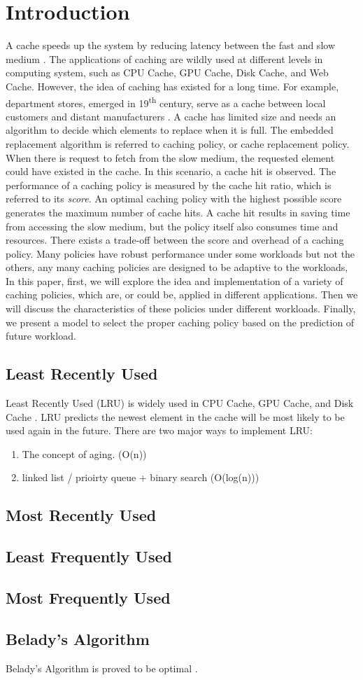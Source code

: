 \section{Introduction}
A cache speeds up the system by reducing latency between the fast and slow medium \cite{cache}.
The applications of caching are wildly used at different levels in computing system, such as
  CPU Cache, GPU Cache, Disk Cache, and Web Cache.
However, the idea of caching has existed for a long time.
For example, department stores, emerged in 19\textsuperscript{th} century,  
  serve as a cache between local customers and distant manufacturers \cite{departmentstores}.
A cache has limited size and needs an algorithm to decide which elements to replace when it is full.
The embedded replacement algorithm is referred to caching policy, or cache replacement policy.
When there is request to fetch from the slow medium, 
  the requested element could have existed in the cache.
In this scenario, a cache hit is observed.
The performance of a caching policy is measured by the cache hit ratio, 
  which is referred to its \textit{score}.
An optimal caching policy with the highest possible score generates the maximum number of cache hits.
A cache hit results in saving time from accessing the slow medium, 
  but the policy itself also consumes time and resources. 
There exists a trade-off between the score and overhead of a caching policy.
Many policies have robust performance under some workloads but not the others,
  any many caching policies are designed to be adaptive to the workloads,
In this paper, first, we will explore the idea and implementation of a variety of caching policies,
  which are, or could be, applied in different applications.
Then we will discuss the characteristics of these policies under different workloads.
Finally, we present a model to select the proper caching policy based on the prediction of future workload.

\subsection{Least Recently Used}
Least Recently Used (LRU) is widely used in CPU Cache, GPU Cache, and Disk Cache \cite{itanium}.
LRU predicts the newest element in the cache will be most likely to be used again in the future.
There are two major ways to implement LRU:
\begin{enumerate}
  \item The concept of aging. (O(n))
  \item linked list / prioirty queue + binary search (O(log(n)))
\end{enumerate}

\subsection{Most Recently Used}

\subsection{Least Frequently Used}

\subsection{Most Frequently Used}

\subsection{Belady's Algorithm}
Belady's Algorithm is proved to be optimal \cite{belady}.
